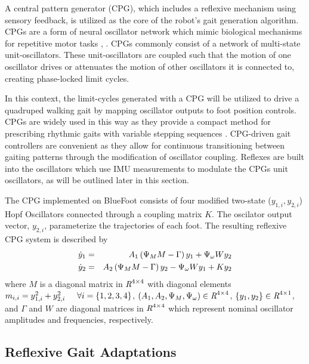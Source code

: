 		A central pattern generator (CPG), which includes a reflexive mechanism using sensory feedback, is utilized as the core of the robot's gait generation algorithm. CPGs are a form of neural oscillator network which mimic biological mechanisms for repetitive motor tasks \cite{Ijspeert2008}, \cite{Collins1993}. CPGs commonly consist of a network of multi-state unit-oscillators. These unit-oscillators are coupled such that the motion of one oscillator drives or attenuates the motion of other oscillators it is connected to, creating phase-locked limit cycles.

		In this context, the limit-cycles generated with a CPG will be utilized to drive a quadruped  walking gait by mapping oscillator outputs to foot position controls. CPGs are widely used in this way as they provide a compact method for prescribing rhythmic gaits with variable stepping sequences 
		\cite{
			Righetti2006,
	 		Castro2008,
			Li2014
		}. 
		CPG-driven gait controllers are convenient as they allow for continuous transitioning between gaiting patterns through the modification of oscillator coupling. Reflexes are built into the oscillators which use IMU measurements to modulate the CPGs unit oscillators, as will be outlined later in this section.

		The CPG implemented on BlueFoot consists of four modified two-state ($y_{1,i},y_{2,i}$) Hopf Oscillators connected through a coupling matrix $K$.  The oscilator output vector, $y_{2,i}$, parameterize the trajectories of each \Ith foot. The resulting reflexive CPG system is described by
		\begin{eqnarray}
			\dot{y}_{1} &=& A_{1}\wrap{ \Psi_{M} M - \Gamma}{y}_{1} + \Psi_{\omega} W {y}_{2} 			\nonumber\\
			\dot{y}_{2} &=& A_{2}\wrap{ \Psi_{M} M - \Gamma}{y}_{2} - \Psi_{\omega} W {y}_{1} + K {y}_{2}	%
			\label{eq::CPGMain}
		\end{eqnarray}
		where $M$ is a diagonal matrix  in $\emph{R}^{4\times4}$ with diagonal elements $m_{i,i}=y_{1,i}^{2}+y_{2,i}^{2} \hspace{5mm} \forall i = \{1,2,3,4\}$, $\left(A_{1},A_{2}, \Psi_{M}, \Psi_{\omega}\right) \in\emph{R}^{4\times4}$, $  \{y_{1}, y_{2}\}  \in\emph{R}^{4\times1}$, and $\Gamma$ and $W$ are diagonal matrices in $\emph{R}^{4\times4}$ which represent nominal oscillator amplitudes and frequencies, respectively.


		\subsection{Reflexive Gait Adaptations}


